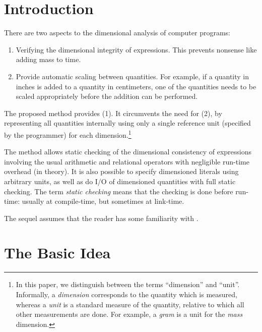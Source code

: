 \section{Introduction}

There are two aspects to the dimensional analysis of computer
programs:

\begin{enumerate}

\item Verifying the dimensional integrity of expressions.  This
prevents nonsense like adding mass to time.

\item Provide automatic scaling between quantities.  For example,
if a quantity in inches is added to a quantity in centimeters, one
of the quantities needs to be scaled appropriately before the
addition can be performed.

\end{enumerate}

The proposed method provides (1).  It circumvents the need for
(2), by representing all quantities internally using only a single
reference unit (specified by the programmer) for each
dimension.\footnote{In this paper, we distinguish between the
terms ``dimension'' and ``unit''.  Informally, a {\em dimension}
corresponds to the quantity which is measured, whereas a {\em
unit} is a standard measure of the quantity, relative to which all
other measurements are done.  For example, a {\em gram} is a unit
for the {\em mass} dimension.}

The method allows static checking of the dimensional consistency
of expressions involving the usual arithmetic and relational
operators with negligible run-time overhead (in theory).  It is
also possible to specify dimensioned literals using arbitrary
units, as well as do I/O of dimensioned quantities with full
static checking.  The term {\em static checking} means that the
checking is done before run-time: usually at compile-time, but
sometimes at link-time.

The sequel assumes that the reader has some familiarity with \cpp.

\section{The Basic Idea} 

\label{Sec:Basic} 

